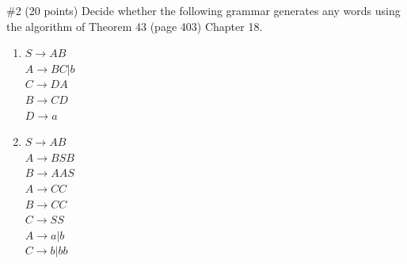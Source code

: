 \begin{problem}{\#2 (20 points)}
    Decide whether the following grammar generates any words using the algorithm of Theorem 43 (page 403) Chapter 18.
    \begin{enumerate}
        \item $S \to AB$\\
        $A \to BC | b$\\
        $C \to DA$\\
        $B \to CD$\\
        $D \to a$
        \item $S \to AB$\\
        $A \to BSB$\\
        $B \to AAS$\\
        $A \to CC$\\
        $B \to CC$\\
        $C \to SS$\\
        $A \to a|b$\\
        $C \to b|bb$
    \end{enumerate}
\end{problem}
